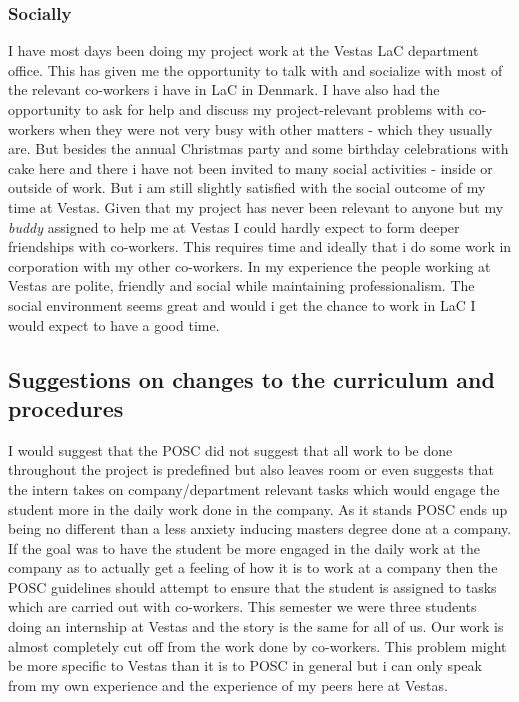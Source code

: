 \subsubsection{Socially}
I have most days been doing my project work at the Vestas LaC department office. This has given me the opportunity to talk with and socialize with most of the relevant co-workers i have in LaC in Denmark. I have also had the opportunity to ask for help and discuss my project-relevant problems with co-workers when they were not very busy with other matters - which they usually are. But besides the annual Christmas party and some birthday celebrations with cake here and there i have not been invited to many social activities - inside or outside of work. But i am still slightly satisfied with the social outcome of my time at Vestas. Given that my project has never been relevant to anyone but my \textit{buddy} assigned to help me at Vestas I could hardly expect to form deeper friendships with co-workers. This requires time and ideally that i do some work in corporation with my other co-workers. In my experience the people working at Vestas are polite, friendly and social while maintaining professionalism. The social environment seems great and would i get the chance to work in LaC I would expect to have a good time.

\subsection{Suggestions on changes to the curriculum and procedures}
I would suggest that the POSC did not suggest that all work to be done throughout the project is predefined but also leaves room or even suggests that the intern takes on company/department relevant tasks which would engage the student more in the daily work done in the company. As it stands POSC ends up being no different than a less anxiety inducing masters degree done at a company. If the goal was to have the student be more engaged in the daily work at the company as to actually get a feeling of how it is to work at a company then the POSC guidelines should attempt to ensure that the student is assigned to tasks which are carried out with co-workers. This semester we were three students doing an internship at Vestas and the story is the same for all of us. Our work is almost completely cut off from the work done by co-workers. This problem might be more specific to Vestas than it is to POSC in general but i can only speak from my own experience and the experience of my peers here at Vestas.


